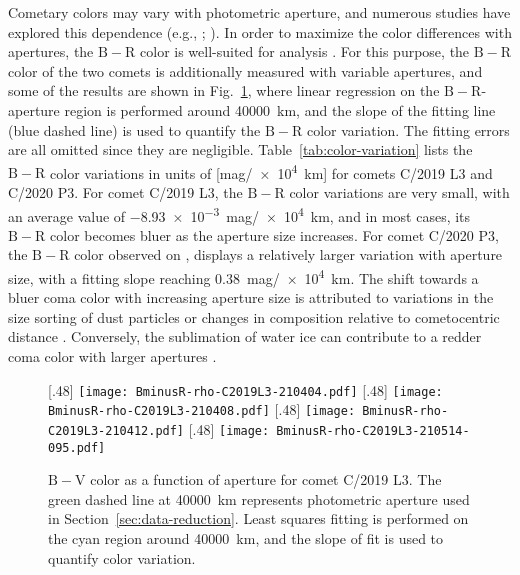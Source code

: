 Cometary colors may vary with photometric aperture, and numerous studies have explored this dependence (e.g., \citealt{betzler_analysis_2017}; \citealt{kolokolova_color_2003}). In order to maximize the color differences with apertures, the $\mathrm{B-R}$ color is well-suited for analysis \citep{jewittCOLORSYSTEMATICSCOMETS2015}. For this purpose, the $\mathrm{B-R}$ color of the two comets is additionally measured with variable apertures, and some of the results are shown in Fig.~\ref{fig:color-aper}, where linear regression on the $\mathrm{B-R}$-aperture region is performed around \qty{40000}{\km}, and the slope of the fitting line (blue dashed line) is used to quantify the $\mathrm{B-R}$ color variation. The fitting errors are all omitted since they are negligible. Table~\ref{tab:color-variation} lists the $\mathrm{B-R}$ color variations in units of [\unit{mag/\qty{e4}{\km}}] for comets C/2019 L3 and C/2020 P3. For comet C/2019 L3, the $\mathrm{B-R}$ color variations are very small, with an average value of \qty{-8.93e-3}{mag/\qty{e4}{\km}}, and in most cases, its $\mathrm{B-R}$ color becomes bluer as the aperture size increases. For comet C/2020 P3, the $\mathrm{B-R}$ color observed on , displays a relatively larger variation with aperture size, with a fitting slope reaching \qty{0.38}{mag/\qty{e4}{\km}}. The shift towards a bluer coma color with increasing aperture size is attributed to variations in the size sorting of dust particles or changes in composition relative to cometocentric distance \citep{kolokolova_physical_2004}. Conversely, the sublimation of water ice can contribute to a redder coma color with larger apertures \citep{kolokolova_color_2003}. 


\begin{figure}
    \centering
    [.48\linewidth]{
        \texttt{[image: BminusR-rho-C2019L3-210404.pdf]}
    }
    [.48\linewidth]{
        \texttt{[image: BminusR-rho-C2019L3-210408.pdf]}
    }
    [.48\linewidth]{
        \texttt{[image: BminusR-rho-C2019L3-210412.pdf]}
    }
    [.48\linewidth]{
        \texttt{[image: BminusR-rho-C2019L3-210514-095.pdf]}
    }
    \caption{$\mathrm{B-V}$ color as a function of aperture for comet C/2019 L3. The green dashed line at {\qty{40000}{\km}} represents photometric aperture used in Section~\ref{sec:data-reduction}. Least squares fitting is performed on the cyan region around {\qty{40000}{\km}}, and the slope of fit is used to quantify color variation. }
    \label{fig:color-aper}
\end{figure}

